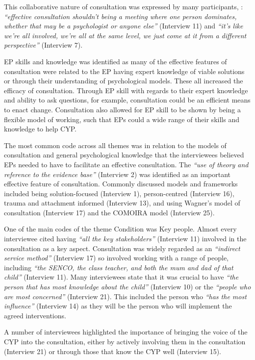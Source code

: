 \documentclass[
  english,
  man,floatsintext]{apa6}
\begin{document}
This collaborative nature of consultation was expressed by many participants, : \emph{``effective consultation shouldn't
being a meeting where one person dominates, whether that may be a
psychologist or anyone else''} (Interview 11) and \emph{``it's like we're all
involved, we're all at the same level, we just come at it from a
different perspective''} (Interview 7).

EP skills and knowledge was identified as many of the effective features
of consultation were related to the EP having expert knowledge of viable
solutions or through their understanding of psychological models. These
all increased the efficacy of consultation. Through EP skill with
regards to their expert knowledge and ability to ask questions, for
example, consultation could be an efficient means to enact change.
Consultation also allowed for EP skill to be shown by being a flexible
model of working, such that EPs could a wide range of their skills and
knowledge to help CYP.

The most common code across all themes was in relation to the models of
consultation and general psychological knowledge that the interviewees
believed EPs needed to have to facilitate an effective consultation. The
\emph{``use of theory and reference to the evidence base''} (Interview 2) was
identified as an important effective feature of consultation. Commonly
discussed models and frameworks included being solution-focused
(Interview 1), person-centred (Interview 16), trauma and attachment
informed (Interview 13), and using Wagner's model of consultation
(Interview 17) and the COMOIRA model (Interview 25).

One of the main codes of the theme Condition was Key people. Almost every interviewee cited having \emph{``all the key stakeholders''}
(Interview 11) involved in the consultation as a key aspect.
Consultation was widely regarded as an \emph{``indirect service method''}
(Interview 17) so involved working with a range of people, including
\emph{``the SENCO, the class teacher, and both the mum and dad of that child''}
(Interview 11). Many interviewees state that it was crucial to have
\emph{``the person that has most knowledge about the child''} (Interview 10) or
the \emph{``people who are most concerned''} (Interview 21). This included the
person who \emph{``has the most influence''} (Interview 14) as they will be the
person who will implement the agreed interventions.

A number of interviewees highlighted the importance of bringing the
voice of the CYP into the consultation, either by actively involving
them in the consultation (Interview 21) or through those that know the
CYP well (Interview 15).
\end{document}
